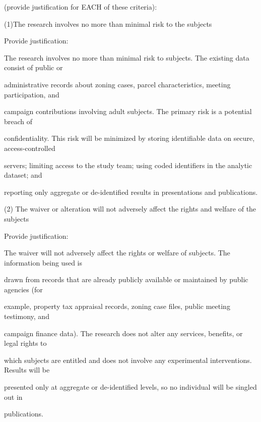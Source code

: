 \documentclass[10pt, letterpaper]{article}
\begin{document}
\begin{responsebox}

(provide justification for EACH of these criteria):

\vspace{0.5em}

\vspace{0.5em}

(1)The research involves no more than minimal risk to the subjects

Provide justification:

The research involves no more than minimal risk to subjects. The existing data consist of public or

administrative records about zoning cases, parcel characteristics, meeting participation, and

campaign contributions involving adult subjects. The primary risk is a potential breach of

confidentiality. This risk will be minimized by storing identifiable data on secure, access-controlled

servers; limiting access to the study team; using coded identifiers in the analytic dataset; and

reporting only aggregate or de-identified results in presentations and publications.

\vspace{0.5em}

\vspace{0.5em}

(2) The waiver or alteration will not adversely affect the rights and welfare of the subjects

Provide justification:

The waiver will not adversely affect the rights or welfare of subjects. The information being used is

drawn from records that are already publicly available or maintained by public agencies (for

example, property tax appraisal records, zoning case files, public meeting testimony, and

campaign finance data). The research does not alter any services, benefits, or legal rights to

which subjects are entitled and does not involve any experimental interventions. Results will be

presented only at aggregate or de-identified levels, so no individual will be singled out in

publications.


\end{responsebox}
\end{document}
